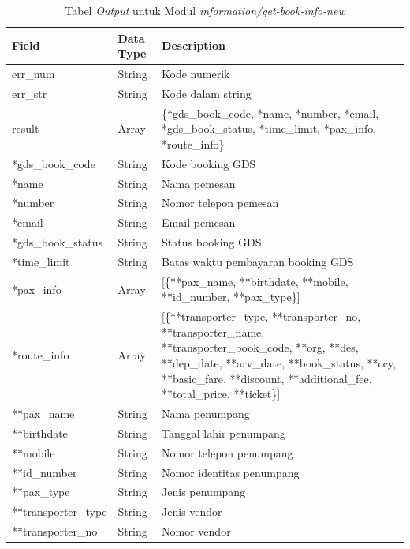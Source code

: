 \begin{table}[H]
	\centering 
	\caption{Tabel \textit{Output} untuk Modul \textit{information/get-book-info-new}}
	\label{tab:getbookinfooutput}
	\begin{tabular}{|l|l|p{8cm}|}
		\hline
		Field & Data Type & Description\\
		\hline

		\hline
        err\_num & String & Kode numerik\\
        \hline
        err\_str & String & Kode dalam string\\
        \hline
        result & Array & \{*gds\_book\_code, *name, *number, *email, *gds\_book\_status, *time\_limit, *pax\_info, *route\_info\}\\
        \hline
        \hline
        *gds\_book\_code & String & Kode booking GDS\\
        \hline
        *name & String & Nama pemesan\\
        \hline
        *number & String & Nomor telepon pemesan\\
        \hline
        *email & String & Email pemesan\\
        \hline
        *gds\_book\_status & String & Status booking GDS\\
        \hline
        *time\_limit & String & Batas waktu pembayaran booking GDS\\
        \hline
        *pax\_info & Array & [\{**pax\_name, **birthdate, **mobile, **id\_number, **pax\_type\}]\\
        \hline
        *route\_info & Array & [\{**transporter\_type, **transporter\_no, **transporter\_name, **transporter\_book\_code, **org, **des, **dep\_date, **arv\_date, **book\_status, **ccy, **basic\_fare, **discount, **additional\_fee, **total\_price, **ticket\}]\\
        \hline
        **pax\_name & String & Nama penumpang\\
        \hline
        **birthdate & String & Tanggal lahir penumpang\\
        \hline
        **mobile & String & Nomor telepon penumpang\\
        \hline
        **id\_number & String & Nomor identitas penumpang\\
        \hline
        **pax\_type & String & Jenis penumpang\\
        \hline
        **transporter\_type & String & Jenis vendor\\
        \hline
        **transporter\_no & String & Nomor vendor\\

\end{tabular}
\end{table}

